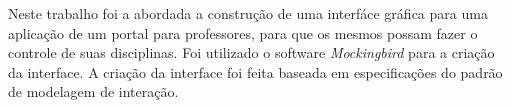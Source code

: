 \begin{resumo} 
Neste trabalho foi a abordada a construção de uma interfáce gráfica para uma 
aplicação de um portal para professores, para  que os mesmos possam fazer
o controle de suas disciplinas.
Foi utilizado o software \textsl{Mockingbird} para a criação da interface. 
A criação da interface foi feita baseada em especificações do padrão de modelagem de
interação.
\end{resumo}

